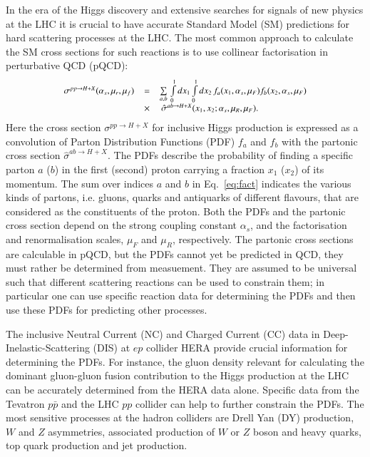 In the era of the Higgs discovery and extensive searches
for signals of new physics at the LHC it is crucial
to have accurate Standard Model (SM) predictions for
hard scattering processes at the LHC.
The most common approach to calculate the SM cross sections for  
such reactions is to use collinear factorisation in perturbative QCD (pQCD):
\begin{equation}
\small
\begin{array}{lcl}
\sigma^{pp\rightarrow H + X}(\alpha_s,\mu_r,\mu_f) & = &
\sum\limits_{a,b}\,  \int\limits_{0}\limits^{1} dx_1 \int\limits_{0}\limits^{1} dx_2\, f_a(x_1,\alpha_s,\mu_F) 
 f_b(x_2,\alpha_s,\mu_F)\\ 
& \times & \, \hat{\sigma}^{ab \rightarrow H + X}(x_1,x_2;\alpha_s,\mu_R,\mu_F).
\label{eq:fact}
\end{array}
\end{equation}
Here the cross section $\sigma^{pp\rightarrow H + X}$ for inclusive
Higgs production is expressed
as a convolution of Parton Distribution Functions (PDF) $f_a$ and $f_b$
with the partonic cross section
$\hat{\sigma}^{ab \rightarrow H + X}$.
%
The PDFs describe 
the probability of finding a specific parton $a$ ($b$) in the first (second) proton carrying a fraction $x_1$ ($x_2$) of its momentum.
%
The sum over indices $a$ and $b$ in Eq.~\ref{eq:fact} indicates the various 
kinds of partons,
i.e. gluons, quarks and antiquarks of different flavours, 
that are considered
as the constituents of the proton.
%
Both the PDFs and the partonic cross section depend on the strong coupling
constant $\alpha_s$, and the factorisation and renormalisation scales,
$\mu_F$ and $\mu_R$, respectively.
%
The partonic cross sections are calculable in pQCD, but
the PDFs cannot yet be predicted in QCD, they must rather be 
determined from measuement. They are assumed 
to be universal such that different scattering reactions can be used 
to constrain them; in particular one can use specific reaction data 
for determining the PDFs and then use these PDFs for
predicting other processes.
%

The inclusive Neutral Current (NC) and Charged Current (CC) data in Deep-Inelastic-Scattering (DIS) at $ep$ collider HERA provide crucial information for determining the PDFs.
%
For instance, the gluon density relevant
for calculating the dominant gluon-gluon fusion contribution to the Higgs production
at the LHC can be accurately determined from the HERA data alone.
%
Specific data from the Tevatron $p\bar{p}$ and the LHC $pp$ collider
can help to further constrain the PDFs.
%
The most sensitive processes at the  hadron colliders are
Drell Yan (DY) production, $W$ and $Z$ asymmetries, associated production of $W$ or $Z$ boson 
and heavy quarks, top quark production and jet production.
%

